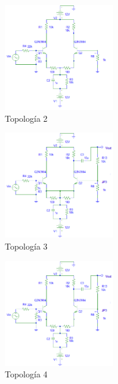 \documentclass[letterpaper, 10 pt, conference]{ieeeconf}  %
\begin{document}
\begin{figure}[H]
 \centering
 \includegraphics[width=0.43\textwidth]{./Imagenes/topologia2.png}
 \caption{Topología 2}
 \label{pic:topologia2}
\end{figure}

\begin{figure}[H]
 \centering
 \includegraphics[width=0.43\textwidth]{./Imagenes/topologia3.png}
 \caption{Topología 3}
 \label{pic:topologia3}
\end{figure}

\begin{figure}[H]
 \centering
 \includegraphics[width=0.43\textwidth]{./Imagenes/topologia4.png}
 \caption{Topología 4}
 \label{pic:topologia4}
\end{figure}
\end{document}
